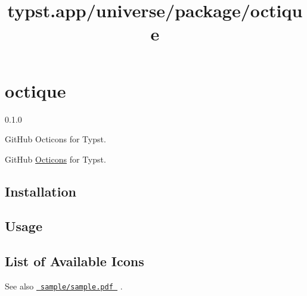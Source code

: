 \title{typst.app/universe/package/octique}

\label{banner}
\section{octique}\label{octique}

{ 0.1.0 }

GitHub Octicons for Typst.

\label{readme}
GitHub \href{https://primer.style/foundations/icons/}{Octicons} for
Typst.

\subsection{Installation}\label{installation}

\begin{Shaded}
\begin{Highlighting}[]
\end{Highlighting}
\end{Shaded}

\subsection{Usage}\label{usage}

\begin{Shaded}
\begin{Highlighting}[]


\end{Highlighting}
\end{Shaded}

\subsection{List of Available Icons}\label{list-of-available-icons}

See also
\href{https://github.com/typst/packages/raw/main/packages/preview/octique/0.1.0/sample/sample.pdf}{\texttt{\ sample/sample.pdf\ }}
.

